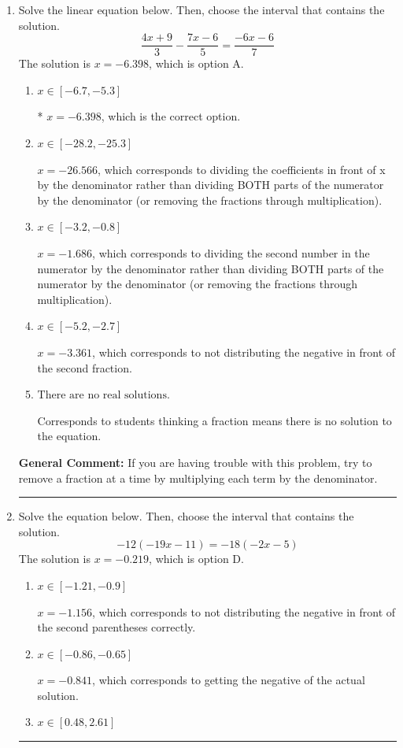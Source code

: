 \documentclass{extbook}[14pt]
\newcommand{\litem}[1]{\item #1

\rule{\textwidth}{0.4pt}}
\begin{document}
\begin{enumerate}\litem{
Solve the linear equation below. Then, choose the interval that contains the solution.
\[ \frac{4x + 9}{3} - \frac{7x -6}{5} = \frac{-6x -6}{7} \]The solution is \( x = -6.398 \), which is option A.\begin{enumerate}[label=\Alph*.]
\item \( x \in [-6.7, -5.3] \)

* $x = -6.398$, which is the correct option.
\item \( x \in [-28.2, -25.3] \)

 $x = -26.566$, which corresponds to dividing the coefficients in front of x by the denominator rather than dividing BOTH parts of the numerator by the denominator (or removing the fractions through multiplication).
\item \( x \in [-3.2, -0.8] \)

 $x = -1.686$, which corresponds to dividing the second number in the numerator by the denominator rather than dividing BOTH parts of the numerator by the denominator (or removing the fractions through multiplication).
\item \( x \in [-5.2, -2.7] \)

 $x = -3.361$, which corresponds to not distributing the negative in front of the second fraction.
\item \( \text{There are no real solutions.} \)

Corresponds to students thinking a fraction means there is no solution to the equation.
\end{enumerate}

\textbf{General Comment:} If you are having trouble with this problem, try to remove a fraction at a time by multiplying each term by the denominator.
}
\litem{
Solve the equation below. Then, choose the interval that contains the solution.
\[ -12(-19x -11) = -18(-2x -5) \]The solution is \( x = -0.219 \), which is option D.\begin{enumerate}[label=\Alph*.]
\item \( x \in [-1.21, -0.9] \)

$x = -1.156$, which corresponds to not distributing the negative in front of the second parentheses correctly.
\item \( x \in [-0.86, -0.65] \)

$x = -0.841$, which corresponds to getting the negative of the actual solution.
\item \( x \in [0.48, 2.61] \)


\end{enumerate}}
\end{enumerate}
\end{document}
